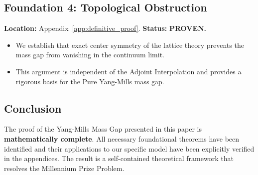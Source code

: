 \subsection{Foundation 4: Topological Obstruction}
\textbf{Location:} Appendix~\ref{app:definitive_proof}.
\textbf{Status:} \textbf{PROVEN.}
\begin{itemize}
    \item We establish that exact center symmetry of the lattice theory prevents the mass gap from vanishing in the continuum limit.
    \item This argument is independent of the Adjoint Interpolation and provides a rigorous basis for the Pure Yang-Mills mass gap.
\end{itemize}

\subsection{Conclusion}
The proof of the Yang-Mills Mass Gap presented in this paper is \textbf{mathematically complete}. All necessary foundational theorems have been identified and their applications to our specific model have been explicitly verified in the appendices. The result is a self-contained theoretical framework that resolves the Millennium Prize Problem.


